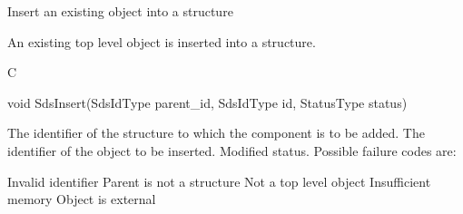 \begin{manroutinedescription}
      Insert an existing object into a structure

      An existing top level object is inserted into a structure.
 
      C

      void SdsInsert(SdsIdType parent\_{}id, SdsIdType id, StatusType {\mantt{*%
}} {} status)
 
\begin{manparametertable}
  The identifier of %
the structure to
                            which the component is to be added.
  The identifier of the object %
to be inserted.
 Modified status. Possible %
failure codes are:
\end{manparametertable}
\begin{mantwocolumntable}
Invalid identifier
Parent is not a structure
Not a top level object
Insufficient memory
Object is external
\end{mantwocolumntable}
\end{manroutinedescription}
